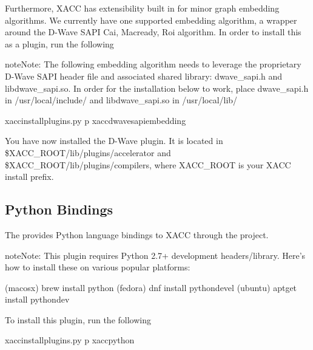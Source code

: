 \documentclass[letterpaper,10pt,english]{sphinxmanual}
\begin{document}
Furthermore, XACC has extensibility built in for minor graph embedding
algorithms. We currently have one supported embedding algorithm, a wrapper around
the D-Wave SAPI Cai, Macready, Roi algorithm. In order to install this as a plugin,
run the following

\begin{sphinxadmonition}{note}{Note:}
The following embedding algorithm needs to leverage the proprietary
D-Wave SAPI header file and associated shared library: dwave\_sapi.h and libdwave\_sapi.so.
In order for the installation below to work, place dwave\_sapi.h in /usr/local/include/
and libdwave\_sapi.so in /usr/local/lib/
\end{sphinxadmonition}

\begin{sphinxVerbatim}[commandchars=\\\{\}]
\PYGZdl{} xacc\PYGZhy{}install\PYGZhy{}plugins.py \PYGZhy{}p xacc\PYGZhy{}dwave\PYGZhy{}sapi\PYGZhy{}embedding
\end{sphinxVerbatim}

You have now installed the D-Wave plugin. It is located in \$XACC\_ROOT/lib/plugins/accelerator
and \$XACC\_ROOT/lib/plugins/compilers, where XACC\_ROOT is your XACC install prefix.


\subsection{Python Bindings}
\label{\detokenize{install:python-bindings}}
The  provides
Python language bindings to XACC through the  project.

\begin{sphinxadmonition}{note}{Note:}
This plugin requires Python 2.7+ development headers/library.
Here’s how to install these on various popular platforms:

\begin{sphinxVerbatim}[commandchars=\\\{\}]
\PYGZdl{} (macosx) brew install python
\PYGZdl{} (fedora) dnf install python\PYGZhy{}devel
\PYGZdl{} (ubuntu) apt\PYGZhy{}get install python\PYGZhy{}dev
\end{sphinxVerbatim}
\end{sphinxadmonition}

To install this plugin, run the following

\begin{sphinxVerbatim}[commandchars=\\\{\}]
\PYGZdl{} xacc\PYGZhy{}install\PYGZhy{}plugins.py \PYGZhy{}p xacc\PYGZhy{}python
\end{sphinxVerbatim}
\end{document}
